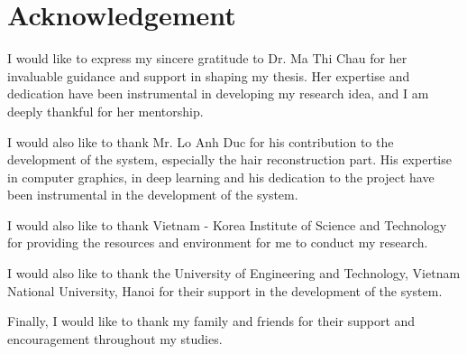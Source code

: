 \section*{Acknowledgement}
\label{sec:acknowledgement}

I would like to express my sincere gratitude to Dr. Ma Thi Chau for her invaluable guidance and support in shaping my thesis. Her expertise and dedication have been instrumental in developing my research idea, and I am deeply thankful for her mentorship.

I would also like to thank Mr. Lo Anh Duc for his contribution to the development of the system, especially the hair reconstruction part. His expertise in computer graphics, in deep learning and his dedication to the project have been instrumental in the development of the system.

I would also like to thank Vietnam - Korea Institute of Science and Technology for providing the resources and environment for me to conduct my research.

I would also like to thank the University of Engineering and Technology, Vietnam National University, Hanoi for their support in the development of the system.

Finally, I would like to thank my family and friends for their support and encouragement throughout my studies.
